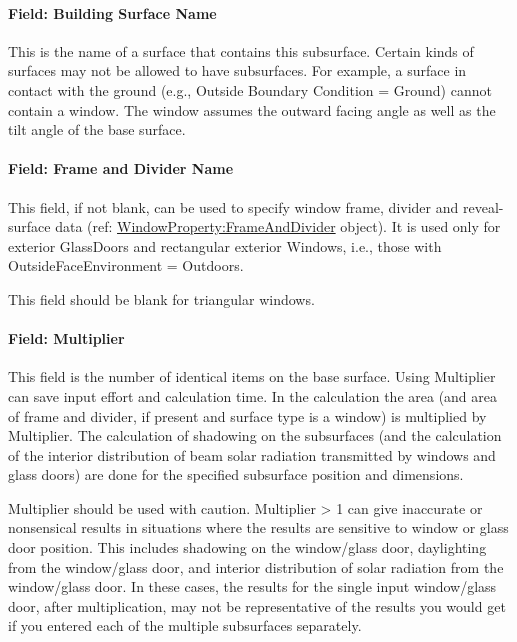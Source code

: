 \paragraph{Field: Building Surface Name}\label{field-building-surface-name-000}

This is the name of a surface that contains this subsurface. Certain kinds of surfaces may not be allowed to have subsurfaces. For example, a surface in contact with the ground (e.g., Outside Boundary Condition = Ground) cannot contain a window. The window assumes the outward facing angle as well as the tilt angle of the base surface.

\paragraph{Field: Frame and Divider Name}\label{field-frame-and-divider-name}

This field, if not blank, can be used to specify window frame, divider and reveal-surface data (ref: \hyperref[windowpropertyframeanddivider]{WindowProperty:FrameAndDivider} object). It is used only for exterior GlassDoors and rectangular exterior Windows, i.e., those with OutsideFaceEnvironment = Outdoors.

This field should be blank for triangular windows.

\paragraph{Field: Multiplier}\label{field-multiplier-1}

This field is the number of identical items on the base surface. Using Multiplier can save input effort and calculation time. In the calculation the area (and area of frame and divider, if present and surface type is a window) is multiplied by Multiplier. The calculation of shadowing on the subsurfaces (and the calculation of the interior distribution of beam solar radiation transmitted by windows and glass doors) are done for the specified subsurface position and dimensions.

Multiplier should be used with caution. Multiplier \textgreater{} 1 can give inaccurate or nonsensical results in situations where the results are sensitive to window or glass door position. This includes shadowing on the window/glass door, daylighting from the window/glass door, and interior distribution of solar radiation from the window/glass door. In these cases, the results for the single input window/glass door, after multiplication, may not be representative of the results you would get if you entered each of the multiple subsurfaces separately.

